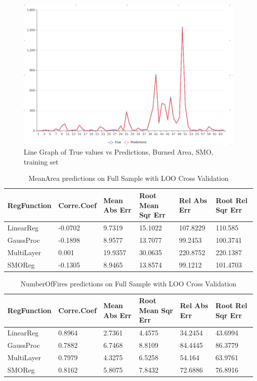 \documentclass[runningheads]{llncs}
\begin{document}
\begin{figure}[H]
    \caption{Line Graph of True values vs Predictions, Burned Area, SMO, training set}\label{LGMB}
    \centerline{\includegraphics[width=1\columnwidth]{imagens/LinearGraphBurned.png}}
\end{figure}

\begin{table}[H]
\caption{MeanArea predictions on Full Sample with LOO Cross Validation}\label{tab4}
\begin{tabular}{|l|l|l|l|l|l|}
\hline
RegFunction & Corre.\break Coef & Mean Abs Err & Root Mean Sqr Err & Rel Abs Err &Root Rel Sqr Err\\
\hline
LinearReg & -0.0702 & 9.7319 & 15.1022 & 107.8229 & 110.585  \\
GaussProc & -0.1898 & 8.9577 & 13.7077 & 99.2453 & 100.3741 \\
MultiLayer & 0.001  & 19.9357 & 30.0635 & 220.8752 & 220.1387 \\
SMOReg & -0.1305 & 8.9465 & 13.8574 & 99.1212 & 101.4703 \\
\hline
\end{tabular}
\end{table}

\begin{table}[H]
\caption{NumberOfFires predictions on Full Sample with LOO Cross Validation}\label{tab5}
\begin{tabular}{|l|l|l|l|l|l|}
\hline
RegFunction & Corre.\break Coef & Mean Abs Err & Root Mean Sqr Err & Rel Abs Err &Root Rel Sqr Err\\
\hline
LinearReg & 0.8964 & 2.7361 & 4.4575 & 34.2454 & 43.6994  \\
GaussProc & 0.7882 & 6.7468 & 8.8109 & 84.4445 & 86.3779 \\
MultiLayer & 0.7979  & 4.3275 & 6.5258 & 54.164 & 63.9761 \\
SMOReg & 0.8162 & 5.8075 & 7.8432 & 72.6886 & 76.8916 \\
\hline
\end{tabular}
\end{table}
\end{document}
